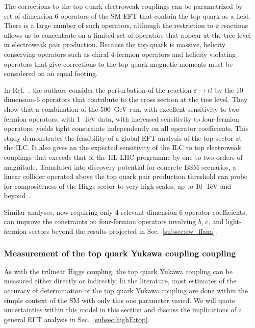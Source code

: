 The corrections to the top quark electroweak couplings can 
be parametrized by set of 
dimension-6 operators of the SM EFT that contain the top quark as a
field. There is a large number of such operators, although the
restriction to $\ee$ reactions allows us to concentrate on a limited
set of operators that appear at the tree level in electroweak pair
production.
Because the top quark is massive, helicity conserving operators such
as chiral 4-fermion operators and helicity violating operators that
give corrections to the top quark magnetic moments must be considered
on an equal footing. 

In 
Ref.~\cite{Durieux:2018tev}, the authors consider the
perturbation of the reaction $\ee\to t\bar t$ by the 10 dimension-6
operators that contribute to the cross section at the tree level.
They show that a 
combination of
 the 500~GeV run, with excellent sensitivity to two-fermion operators,
with 1~TeV{} data, with increased sensitivity to four-fermion
operators, yields  tight constraints independently on 
all operator coefficients.  This study demonstrates the feasibility of a global EFT analysis of the top sector
at the ILC.  It also gives an the expected sensitivity of the ILC to
top electroweak couplings that  exceeds that of the HL-LHC programme by one to two orders of
magnitude. Translated into discovery potential for concrete BSM scenarios, a linear collider operated above the top quark
pair production threshold can probe for compositeness of the Higgs
sector to very high scales, up to 10~TeV and
beyond~\cite{Durieux:2018ekg}. 


Similar analyses, now requiring  only 4 relevant dimension-6 operator coefficients, can
improve the constraints on four-fermion operators involving $b$, $c$,
and light-fermion sectors beyond the results projected in
Sec.~\ref{subsec:ew_ffana}.



\subsubsection{Measurement of the top quark Yukawa coupling coupling}
\label{subsec:top:topYukawa}


As with the trilinear Higgs coupling, the top quark Yukawa coupling can be
measured either directly or indirectly.  In the literature, most
estimates of the accuracy of determination of the top quark Yukawa
coupling are done within the simple context of the SM with only this
one parameter varied.   We will quote uncertainties
within
this model in this section and discuss the implications of a general 
EFT analysis in Sec.~\ref{subsec:highE:top}.

